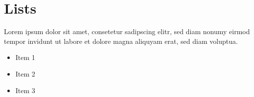 \section{Lists}
\label{sec:lists}

	Lorem ipsum dolor sit amet, consetetur sadipscing elitr, sed diam nonumy eirmod tempor invidunt ut labore et dolore magna aliquyam erat, sed diam voluptua.
	
	\begin{itemize}
		\item{Item 1}
		\item{Item 2}
		\item{Item 3}
	\end{itemize}